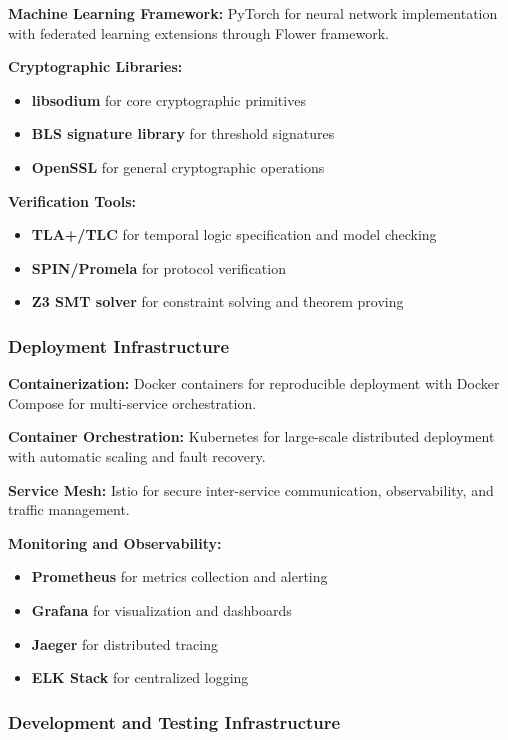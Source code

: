 \documentclass[conference]{IEEEtran}
\begin{document}
\textbf{Machine Learning Framework:} PyTorch for neural network implementation with federated learning extensions through Flower framework.

\textbf{Cryptographic Libraries:} 
\begin{itemize}
    \item \textbf{libsodium} for core cryptographic primitives
    \item \textbf{BLS signature library} for threshold signatures
    \item \textbf{OpenSSL} for general cryptographic operations
\end{itemize}

\textbf{Verification Tools:}
\begin{itemize}
    \item \textbf{TLA+/TLC} for temporal logic specification and model checking
    \item \textbf{SPIN/Promela} for protocol verification
    \item \textbf{Z3 SMT solver} for constraint solving and theorem proving
\end{itemize}

\subsubsection{Deployment Infrastructure}

\textbf{Containerization:} Docker containers for reproducible deployment with Docker Compose for multi-service orchestration.

\textbf{Container Orchestration:} Kubernetes for large-scale distributed deployment with automatic scaling and fault recovery.

\textbf{Service Mesh:} Istio for secure inter-service communication, observability, and traffic management.

\textbf{Monitoring and Observability:}
\begin{itemize}
    \item \textbf{Prometheus} for metrics collection and alerting
    \item \textbf{Grafana} for visualization and dashboards
    \item \textbf{Jaeger} for distributed tracing
    \item \textbf{ELK Stack} for centralized logging
\end{itemize}

\subsubsection{Development and Testing Infrastructure}
\end{document}

